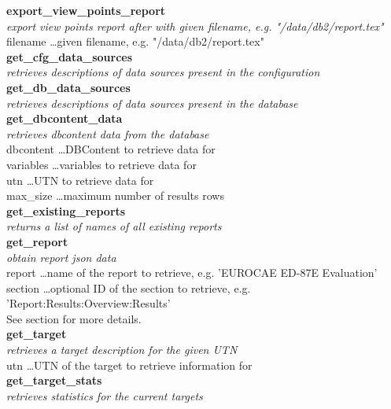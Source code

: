 \textbf{export\_view\_points\_report} \\
\textit{export view points report after with given filename, e.g. "/data/db2/report.tex"} \\
filename \dots given filename, e.g. "/data/db2/report.tex" \\

\textbf{get\_cfg\_data\_sources} \\
\textit{retrieves descriptions of data sources present in the configuration} \\

\textbf{get\_db\_data\_sources} \\
\textit{retrieves descriptions of data sources present in the database} \\

\textbf{get\_dbcontent\_data} \\
\textit{retrieves dbcontent data from the database} \\
dbcontent \dots DBContent to retrieve data for \\
variables \dots variables to retrieve data for \\
utn \dots UTN to retrieve data for \\
max\_size \dots maximum number of results rows \\

\textbf{get\_existing\_reports} \\
\textit{returns a list of names of all existing reports} \\

\textbf{get\_report} \\
\textit{obtain report json data} \\
report \dots name of the report to retrieve, e.g. 'EUROCAE ED-87E Evaluation' \\
section \dots optional ID of the section to retrieve, e.g. 'Report:Results:Overview:Results' \\
See section  for more details. \\

\textbf{get\_target} \\
\textit{retrieves a target description for the given UTN} \\
utn \dots UTN of the target to retrieve information for \\

\textbf{get\_target\_stats} \\
\textit{retrieves statistics for the current targets} \\

